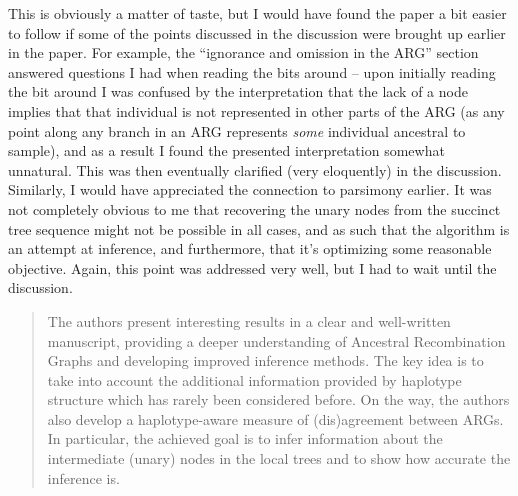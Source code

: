 
\begin{point}{}
 This is obviously a matter of taste, but I would have found the paper a bit easier to follow if some of the points discussed in the discussion were brought up earlier in the paper. For example, the ``ignorance and omission in the ARG'' section 
answered questions I had when reading the bits around  -- upon initially reading the bit around 
I was confused by the interpretation that the lack of a node implies that that individual is not represented in other parts of the ARG (as any point along any branch in an ARG represents \emph{some} individual ancestral to sample), and as a result I found the presented interpretation somewhat unnatural.
This was then eventually clarified (very eloquently) in the discussion.
Similarly, I would have appreciated the connection to parsimony earlier.
It was not completely obvious to me that recovering the unary nodes from the succinct tree sequence might not be possible in all cases, and as such that the algorithm is an attempt at inference, and furthermore, that it's optimizing some reasonable objective. Again, this point was addressed very well, but I had to wait until the discussion.
\end{point}






\begin{quote}
The authors present interesting results in a clear and well-written manuscript, providing a deeper understanding of Ancestral Recombination Graphs and developing improved inference methods. The key idea is to take into account the additional information provided by haplotype structure which has rarely been considered before. On the way, the authors also develop a haplotype-aware measure of (dis)agreement between ARGs. In particular, the achieved goal is to infer information about the intermediate (unary) nodes in the local trees and to show how accurate the inference is.
\end{quote}

